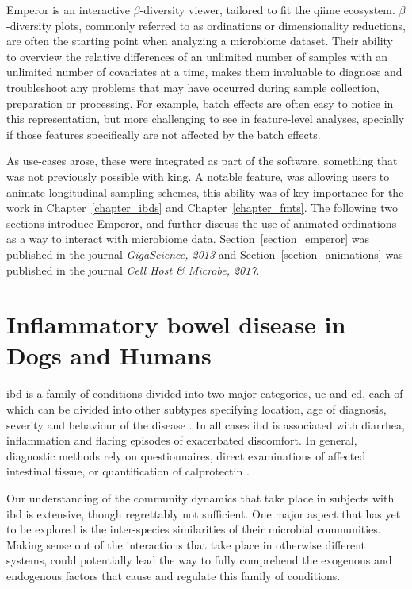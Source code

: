 \documentclass[12pt,chapterheads]{ucsd}
\begin{document}
Emperor is an interactive $\beta$-diversity viewer, tailored to fit the 
\gls{qiime} ecosystem. $\beta$-diversity plots, commonly referred to as 
ordinations or dimensionality reductions, are often the starting point when 
analyzing a microbiome dataset. Their ability to overview the relative 
differences of an unlimited number of samples with an unlimited number of 
covariates at a time, makes them invaluable to diagnose and troubleshoot any 
problems that may have occurred during sample collection, preparation or 
processing. For example, batch effects are often easy to notice in this 
representation\cite{Gibbons165910}, but more challenging to see in 
feature-level analyses, specially if those features specifically are not 
affected by the batch effects.

As use-cases arose, these were integrated as part of the software, something 
that was not previously possible with \gls{king}. A notable feature, was 
allowing users to animate longitudinal sampling schemes, this ability was of 
key importance for the work in Chapter~\ref{chapter_ibds} and 
Chapter~\ref{chapter_fmts}. The following two sections introduce Emperor, and 
further discuss the use of animated ordinations as a way to interact with 
microbiome data. Section~\ref{section_emperor} was published in the journal 
\textsl{GigaScience, 2013} and Section~\ref{section_animations} was published 
in the journal \textsl{Cell Host \& Microbe, 2017}.

\ifdefined\RELEASE
    
    
\fi

\chapter{Inflammatory bowel disease in Dogs and Humans}\label{chapter_dogs}

\gls{ibd} is a family of conditions divided into two major categories, \gls{uc} 
and \gls{cd}, each of which can be divided into other subtypes specifying 
location, age of diagnosis, severity and behaviour of the disease 
\cite{RN4265}.  In all cases \gls{ibd} is associated with diarrhea, 
inflammation and flaring episodes of exacerbated discomfort. In general, 
diagnostic methods rely on questionnaires, direct examinations of affected 
intestinal tissue, or quantification of calprotectin \cite{Sipponen2008}.

Our understanding of the community dynamics that take place in subjects with 
\gls{ibd} is extensive, though regrettably not sufficient. One major aspect 
that has yet to be explored is the inter-species similarities of their 
microbial communities. Making sense out of the interactions that take place in 
otherwise different systems, could potentially lead the way to fully comprehend 
the exogenous and endogenous factors that cause and regulate this family of 
conditions.
\end{document}
